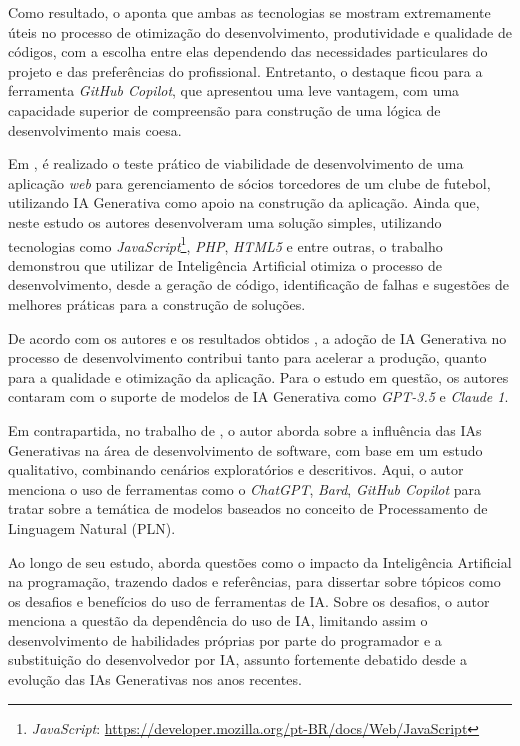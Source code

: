 \documentclass[english,brazilian]{UNISINOSartigo} %
\begin{document}
Como resultado, o  aponta que ambas as tecnologias se mostram extremamente úteis no processo de otimização do desenvolvimento, produtividade e qualidade de códigos, com a escolha entre elas dependendo das necessidades particulares do projeto e das preferências do profissional. Entretanto, o destaque ficou para a ferramenta \textit{GitHub Copilot}, que apresentou uma leve vantagem, com uma capacidade superior de compreensão para construção de uma lógica de desenvolvimento mais coesa.

Em , é realizado o teste prático de viabilidade de desenvolvimento de uma aplicação \textit{web} para gerenciamento de sócios torcedores de um clube de futebol, utilizando IA Generativa como apoio na construção da aplicação. Ainda que, neste estudo os autores desenvolveram uma solução simples, utilizando tecnologias como \textit{JavaScript}\footnote{\textit{JavaScript}: \url{https://developer.mozilla.org/pt-BR/docs/Web/JavaScript}}, \textit{PHP}, \textit{HTML5} e entre outras, o trabalho demonstrou que utilizar de Inteligência Artificial otimiza o processo de desenvolvimento, desde a geração de código, identificação de falhas e sugestões de melhores práticas para a construção de soluções.

De acordo com os autores e os resultados obtidos \cite{daSilva2025}, a adoção de IA Generativa no processo de desenvolvimento contribui tanto para acelerar a produção, quanto para a qualidade e otimização da aplicação. Para o estudo em questão, os autores contaram com o suporte de modelos de IA Generativa como \textit{GPT-3.5} e \textit{Claude 1}.

Em contrapartida, no trabalho de , o autor aborda sobre a influência das IAs Generativas na área de desenvolvimento de software, com base em um estudo qualitativo, combinando cenários exploratórios e descritivos. Aqui, o autor menciona o uso de ferramentas como o \textit{ChatGPT}, \textit{Bard}, \textit{GitHub Copilot} para tratar sobre a temática de modelos baseados no conceito de Processamento de Linguagem Natural (PLN).

Ao longo de seu estudo,  aborda questões como o impacto da Inteligência Artificial na programação, trazendo dados e referências, para dissertar sobre tópicos como os desafios e benefícios do uso de ferramentas de IA. Sobre os desafios, o autor menciona a questão da dependência do uso de IA, limitando assim o desenvolvimento de habilidades próprias por parte do programador e a substituição do desenvolvedor por IA, assunto fortemente debatido desde a evolução das IAs Generativas nos anos recentes. 
\end{document}
